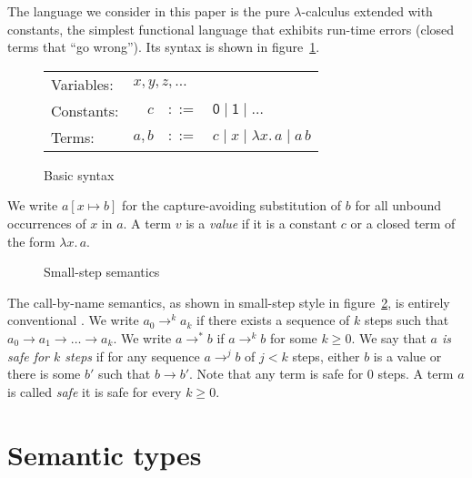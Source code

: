 \documentclass[12pt,a4paper,draft]{article}
\theoremstyle{definition}
\theoremstyle{plain}
\newcommand{\abstr}[2]{\ensuremath{\lambda{#1}.\,{#2}}}
\newcommand{\app}[2]{\ensuremath{{#1}\,{#2}}}
\begin{document}
The language we consider in this paper is the pure $\lambda$-calculus extended with constants,
the simplest functional language that exhibits run-time errors (closed terms that ``go wrong'').
Its syntax is shown in figure~\ref{fig:Basic_syntax}.
\begin{figure}[htb]
  \centering
  \begin{tabular}{lrcl}
    Variables: & \multicolumn{3}{l}{$x,y,z,\ldots$} \\
    Constants: & $c$ & $::=$ & $\mathsf{0} \mid \mathsf{1} \mid \ldots$ \\
    Terms: & $a,b$ & $::=$ & $c \mid x \mid \abstr{x}{a} \mid \app{a}{b}$
  \end{tabular}
  \caption{Basic syntax}
  \label{fig:Basic_syntax}
\end{figure}
We write $a[x \mapsto b]$ for the capture-avoiding substitution of $b$ for all unbound occurrences
of $x$ in $a$. A term $v$ is a \emph{value} if it is a constant $c$ or a closed term of the form
$\abstr{x}{a}$.
\begin{figure}[htb]
  \centering
  \caption{Small-step semantics}
  \label{fig:Small_step_semantics}
\end{figure}
The call-by-name semantics, as shown in small-step style in figure~\ref{fig:Small_step_semantics}, is entirely
conventional \cite{Pierce02}. We write $a_0 \to^k a_k$ if there exists a sequence of $k$ steps such that
$a_0 \to a_1 \to \ldots \to a_k$. We write $a \to^* b$ if $a \to^k b$ for some $k \ge 0$. We say that
\emph{$a$ is safe for $k$ steps} if for any sequence $a \to^j b$ of $j < k$ steps, either $b$ is a value
or there is some $b'$ such that $b \to b'$. Note that any term is safe for $0$ steps. A term $a$ is called
\emph{safe} it is safe for every $k \ge 0$.


\section{Semantic types}
\label{sec:Semantic_types}
\end{document}
